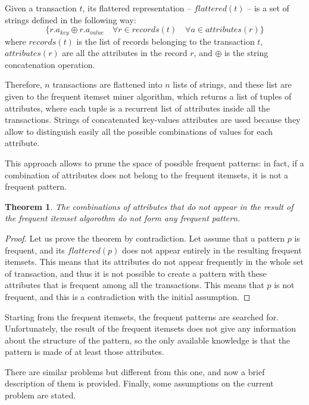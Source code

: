 \documentclass{acm_proc_article-sp-sigmod09}
\begin{document}
\begin{definition}
Given a transaction $t$, its flattered representation -- $flattered(t)$ -- is a set of strings defined in the following way:
\[
\{r.a_{key} \oplus r.a_{value} \quad \forall r \in records(t) \quad \forall a \in attributes(r) \}
\]
where $records(t)$ is the list of records belonging to the transaction $t$, $attributes(r)$ are all the attributes in the record $r$, and $\oplus$ is the string concatenation operation.
\end{definition}

Therefore, $n$ transactions are flattened into $n$ lists of strings, and these list are given to the frequent itemset miner algorithm, which returns a list of tuples of attributes, where each tuple is a recurrent list of attributes inside all the transactions. Strings of concatenated key-values attributes are used because they allow to distinguish easily all the possible combinations of values for each attribute.

This approach allows to prune the space of possible frequent patterns: in fact, if a combination of attributes does not belong to the frequent itemsets, it is not a frequent pattern.

\newtheorem{theorem}{Theorem}
\begin{theorem}
The combinations of attributes that do not appear in the result of the frequent itemset algorothm do not form any frequent pattern.
\end{theorem}

\begin{proof}
Let us prove the theorem by contradiction. Let assume that a pattern $p$ is frequent, and its $flattered(p)$ does not appear entirely in the resulting frequent itemsets. This means that its attributes do not appear frequently in the whole set of transaction, and thus it is not possible to create a pattern with these attributes that is frequent among all the transactions. This means that $p$ is not frequent, and this is a contradiction with the initial assumption.
\end{proof}

Starting from the frequent itemsets, the frequent patterns are searched for. Unfortunately, the result of the frequent itemsets does not give any information about the structure of the pattern, so the only available knowledge is that the pattern is made of at least those attributes.

There are similar problems but different from this one, and now a brief description of them is provided. Finally, some assumptions on the current problem are stated.
\end{document}
